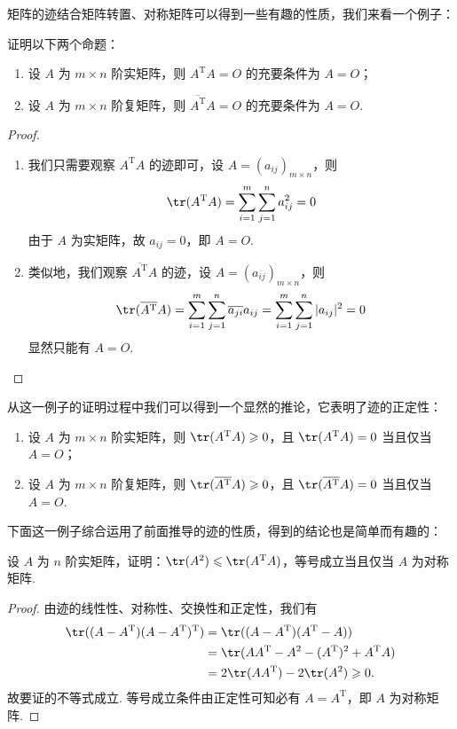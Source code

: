 矩阵的迹结合矩阵转置、对称矩阵可以得到一些有趣的性质，我们来看一个例子：
\begin{example}{}{}
    证明以下两个命题：
    \begin{enumerate}
        \item 设 $A$ 为 $m \times n$ 阶实矩阵，则 $A^\mathrm{T}A = O$ 的充要条件为 $A = O$；
        \item 设 $A$ 为 $m \times n$ 阶复矩阵，则 $\overline{A^\mathrm{T}}A = O$ 的充要条件为 $A = O$.
    \end{enumerate}
\end{example}
\begin{proof}
    \begin{enumerate}
        \item 我们只需要观察 $A^\mathrm{T}A$ 的迹即可，设 $A = (a_{ij})_{m \times n}$，则
        \[ \tr(A^\mathrm{T}A) = \sum\limits_{i=1}^m \sum\limits_{j=1}^n a_{ij}^2 = 0 \]
        由于 $A$ 为实矩阵，故 $a_{ij} = 0$，即 $A = O$.
        \item 类似地，我们观察 $\overline{A^\mathrm{T}}A$ 的迹，设 $A = (a_{ij})_{m \times n}$，则
        \[ \tr(\overline{A^\mathrm{T}}A) = \sum\limits_{i=1}^m \sum\limits_{j=1}^n \overline{a_{ji}}a_{ij} = \sum\limits_{i=1}^m \sum\limits_{j=1}^n |a_{ij}|^2 = 0 \]
        显然只能有 $A = O$.
    \end{enumerate}
\end{proof}

从这一例子的证明过程中我们可以得到一个显然的推论，它表明了迹的正定性：
\begin{corollary}{}{}
    \begin{enumerate}
        \item 设 $A$ 为 $m \times n$ 阶实矩阵，则 $\tr(A^\mathrm{T}A) \geqslant 0$，且 $\tr(A^\mathrm{T}A) = 0$ 当且仅当 $A = O$；
        \item 设 $A$ 为 $m \times n$ 阶复矩阵，则 $\tr(\overline{A^\mathrm{T}}A) \geqslant 0$，且 $\tr(\overline{A^\mathrm{T}}A) = 0$ 当且仅当 $A = O$.
    \end{enumerate}
\end{corollary}

下面这一例子综合运用了前面推导的迹的性质，得到的结论也是简单而有趣的：
\begin{example}{}{}
    设 $A$ 为 $n$ 阶实矩阵，证明：$\tr(A^2) \leqslant \tr(A^{\mathrm{T}}A)$，等号成立当且仅当 $A$ 为对称矩阵.
\end{example}
\begin{proof}
    由迹的线性性、对称性、交换性和正定性，我们有
    \begin{align*}
        \tr((A - A^\mathrm{T})(A - A^\mathrm{T})^\mathrm{T}) & = \tr((A - A^\mathrm{T})(A^\mathrm{T} - A)) \\
        & = \tr(AA^\mathrm{T} - A^2 - (A^{\mathrm{T}})^2 + A^{\mathrm{T}}A) \\
        & = 2\tr(AA^{\mathrm{T}}) - 2\tr(A^2) \geqslant 0.
    \end{align*}
    故要证的不等式成立. 等号成立条件由正定性可知必有 $A = A^\mathrm{T}$，即 $A$ 为对称矩阵.
\end{proof}

